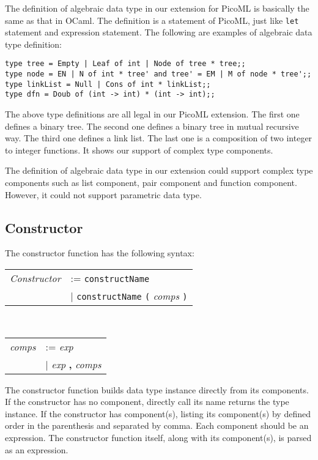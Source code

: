 \documentclass[a4paper,12pt]{article}
\begin{document}
		The definition of algebraic data type in our extension for PicoML is basically the same as that in OCaml. The definition is a statement of PicoML, just like \texttt{let} statement and expression statement. The following are examples of algebraic data type definition:\\
		\begin{lstlisting}
type tree = Empty | Leaf of int | Node of tree * tree;;
type node = EN | N of int * tree' and tree' = EM | M of node * tree';;
type linkList = Null | Cons of int * linkList;;
type dfn = Doub of (int -> int) * (int -> int);;
		\end{lstlisting}
		The above type definitions are all legal in our PicoML extension. The first one defines a binary tree. The second one defines a binary tree in mutual recursive way. The third one defines a link list. The last one is a composition of two integer to integer functions. It shows our support of complex type components.
		
		The definition of algebraic data type in our extension could support complex type components such as list component, pair component and function component. However, it could not support parametric data type.

	\subsection{Constructor}
		The constructor function has the following syntax:\\
		\begin{tabular}{ll}
			\textit{Constructor} & := \texttt{constructName} \\
			& $\vert$ \texttt{constructName} \texttt{(} \textit{comps} \texttt{)}
		\end{tabular}\\
		\begin{tabular}{ll}
			\textit{comps} & := \textit{exp} \\
			& $\vert$ \textit{exp} \textbf{,} \textit{comps}
		\end{tabular}
	
		The constructor function builds data type instance directly from its components. If the constructor has no component, directly call its name returns the type instance. If the constructor has component(s), listing its component(s) by defined order in the parenthesis and separated by comma. Each component should be an expression. The constructor function itself, along with its component(s), is parsed as an expression.
		
\end{document}
